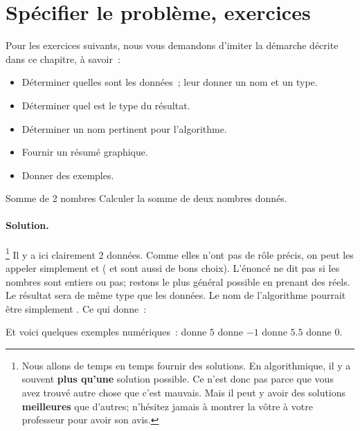 \section{Spécifier le problème, exercices}
	
		Pour les exercices suivants, 
		nous vous demandons d’imiter la démarche décrite dans ce chapitre, 
		à savoir~:
		\begin{itemize}
			\item Déterminer quelles sont les données~;
				leur donner un nom et un type.
			\item Déterminer quel est le type du résultat.
			\item Déterminer un nom pertinent pour l’algorithme.
			\item Fournir un résumé graphique.
			\item Donner des exemples.
		\end{itemize}
	
		\begin{Exercice}{Somme de 2 nombres}
			Calculer la somme de deux nombres donnés.
			\paragraph{Solution.}%
			\footnote{%
				Nous allons de temps en temps 
				fournir des solutions.
				En algorithmique,
				il y a souvent \textbf{plus qu’une} solution possible.
				Ce n’est donc pas parce que vous avez trouvé autre chose
				que c’est mauvais.
				Mais il peut y avoir des solutions \textbf{meilleures}
				que d’autres; 
				n’hésitez jamais à montrer la vôtre
				à votre professeur pour avoir son avis.
			}
			Il y a ici clairement 2 données.
			Comme elles n’ont pas de rôle précis,
			on peut les appeler simplement 
			et 
			( et  sont aussi de bons choix).
			L’énoncé ne dit pas si les nombres sont entiers ou pas;
			restons le plus général possible en prenant des réels.
			Le résultat sera de même type que les données.
			Le nom de l’algorithme pourrait être simplement .
			Ce qui donne~:
			\begin{center}
			\end{center}			 
			Et voici quelques exemples numériques~:	
				 donne $5$      \quad
				 donne $-1$    \quad
				 donne $5.5$  \quad
				 donne $0$.
		\end{Exercice}
	
